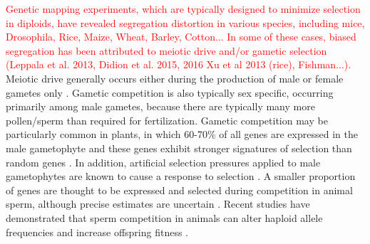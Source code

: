 \documentclass[12pt]{article}
\begin{document}
\textcolor{red}{Genetic mapping experiments, which are typically designed to minimize selection in diploids, have revealed segregation distortion in various species, including mice, Drosophila, Rice, Maize, Wheat, Barley, Cotton... 
In some of these cases, biased segregation has been attributed to meiotic drive and/or gametic selection \textcolor{red}{(Leppala et al. 2013, Didion et al. 2015, 2016 Xu et al 2013 (rice), Fishman...)}. } 
Meiotic drive generally occurs either during the production of male or female gametes only \citep{Ubeda:2005gw,Lindholm:2016cw}.
Gametic competition is also typically sex specific, occurring primarily among male gametes, because there are typically many more pollen/sperm than required for fertilization.
Gametic competition may be particularly common in plants, in which 60-70\% of all genes are expressed in the male gametophyte and these genes exhibit stronger signatures of selection than random genes \citep{Borg:2009jpa,Arunkumar:2013iq,Gossmann:2014dua}.
In addition, artificial selection pressures applied to male gametophytes are known to cause a response to selection \citep[e.g.,][]{Hormaza:1996cv,Ravikumar:2003uo,Hedhly:2004iv,Clarke:2004ir}. 
A smaller proportion of genes are thought to be expressed and selected during competition in animal sperm, although precise estimates are uncertain \citep{Zheng:2001fi,JOSEPH:2004haa,Vibranovski:2010et}. 
Recent studies have demonstrated that sperm competition in animals can alter haploid allele frequencies and increase offspring fitness \citep{Immler:2014im,Alavioon2017}.
\end{document}
